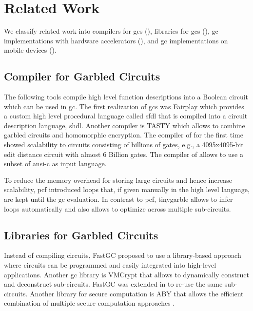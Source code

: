 \chapter{Related Work}
We classify related work into compilers for \acrshort{gc}s (), libraries for \acrshort{gc}s (), \acrshort{gc} implementations with hardware accelerators (), and \acrshort{gc} implementations on mobile devices ().

\section{Compiler for Garbled Circuits}
The following tools compile high level function descriptions into a Boolean circuit which can be used in \acrshort{gc}.
The first realization of \acrshort{gc}s was Fairplay \cite{malkhi2004fairplay} which provides a custom high level procedural language called \acrfull{sfdl} that is compiled into a circuit description language, \acrfull{shdl}.
Another compiler is TASTY \cite{henecka2010tasty} which allows to combine garbled circuits and homomorphic encryption.
The compiler of \cite{kreuter2012billion} for the first time showed scalability to circuits consisting of billions of gates, e.g., a 4095x4095-bit edit distance circuit with almost 6 Billion gates.
The compiler of \cite{franz2014cbmc} allows to use a subset of \acrshort{ansi}-\gls{c} as input language.

To reduce the memory overhead for storing large circuits and hence increase scalability, \gls{pcf} \cite{kreuter2013pcf} introduced loops that, if given manually in the high level language, are kept until the \acrshort{gc} evaluation.
In contrast to \gls{pcf}, \gls{tinygarble} allows to infer loops automatically and also allows to optimize across multiple sub-circuits.

\section{Libraries for Garbled Circuits}
Instead of compiling circuits, FastGC \cite{huang2011faster} proposed to use a library-based approach where circuits can be programmed and easily integrated into high-level applications.
Another \acrshort{gc} library is VMCrypt \cite{malka2011vmcrypt} that allows to dynamically construct and deconstruct sub-circuits.
FastGC was extended in \cite{henecka2013faster} to re-use the same sub-circuits.
Another library for secure computation is ABY that allows the efficient combination of multiple secure computation approaches \cite{demmler2015aby}.

